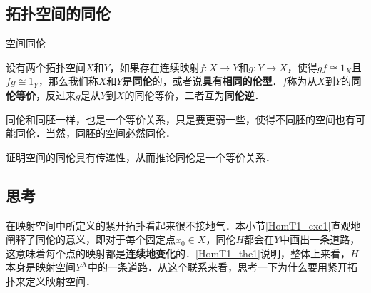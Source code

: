 \subsection{拓扑空间的同伦}

\begin{definition}{空间同伦}

设有两个拓扑空间$X$和$Y$，如果存在连续映射$f:X\rightarrow Y$和$g:Y\rightarrow X$，使得$gf\cong 1_X$且$fg\cong 1_Y$，那么我们称$X$和$Y$是\textbf{同伦}的，或者说\textbf{具有相同的伦型}．$f$称为从$X$到$Y$的\textbf{同伦等价}，反过来$g$是从$Y$到$X$的同伦等价，二者互为\textbf{同伦逆}．

\end{definition}

同伦和同胚一样，也是一个等价关系，只是要更弱一些，使得不同胚的空间也有可能同伦．当然，同胚的空间必然同伦．

\begin{exercise}{}
证明空间的同伦具有传递性，从而推论同伦是一个等价关系．
\end{exercise}

\subsection{思考}

在映射空间中所定义的紧开拓扑看起来很不接地气．本小节\autoref{HomT1_exe1}直观地阐释了同伦的意义，即对于每个固定点$x_0\in X$，同伦$H$都会在$Y$中画出一条道路，这意味着每个点的映射都是\textbf{连续地变化}的．\autoref{HomT1_the1}说明，整体上来看，$H$本身是映射空间$Y^X$中的一条道路．从这个联系来看，思考一下为什么要用紧开拓扑来定义映射空间．

